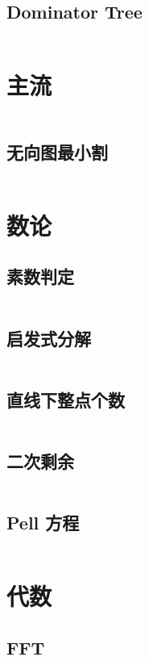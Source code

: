 \documentclass[titlepage,landscape,a4paper,10pt]{article}
\begin{document}
\begin{multicols}{2}
\begin{spacing}{0.8}
\subsection{Dominator Tree}
\inputminted{cpp}{improve/DominatorTree.cpp}

\section{主流}
\inputminted{cpp}{improve/MincostFlow.cpp}

\subsection{无向图最小割}
\inputminted{cpp}{src/无向图最小割.cpp}

\section{数论}

\subsection{素数判定}
\inputminted{cpp}{src/素数判定.cpp}

\subsection{启发式分解}
\inputminted{cpp}{src/启发式分解.cpp}

\subsection{直线下整点个数}
\inputminted{cpp}{src/直线下格点统计.cpp}

\subsection{二次剩余}
\inputminted{cpp}{src/二次剩余.cpp}

\subsection{Pell 方程}
\inputminted{cpp}{src/Pell方程.cpp}

\section{代数}

\subsection{FFT}
\inputminted{cpp}{improve/FFT.cpp}


\end{spacing}
\end{multicols}
\end{document}
